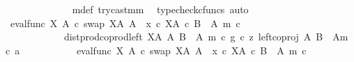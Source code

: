 \begin{isabellebody}
\ \ \ \ \ \ \ \ \ \ \ \ \isamarkupfalse%
\ m{\isacharunderscore}{\kern0pt}def{\isacharparenleft}{\kern0pt}{}{\isacharparenright}{\kern0pt}\ try{\isacharunderscore}{\kern0pt}cast{\isacharunderscore}{\kern0pt}m{\isacharunderscore}{\kern0pt}m\ \isamarkupfalse%
\ {\isacharparenleft}{\kern0pt}typecheck{\isacharunderscore}{\kern0pt}cfuncs{\isacharcomma}{\kern0pt}\ auto{\isacharparenright}{\kern0pt}\isanewline
\ \ \ \ \ \ \ \ \ \ \isamarkupfalse%
\ \isamarkupfalse%
\ {\isachardoublequoteopen}{\isacharparenleft}{\kern0pt}eval{\isacharunderscore}{\kern0pt}func\ X\ A\ {\isasymcirc}\isactrlsub c\ swap\ {\isacharparenleft}{\kern0pt}X\isactrlbsup A\isactrlesup {\isacharparenright}{\kern0pt}\ A{\isacharparenright}{\kern0pt}\ {\isasymamalg}\ {\isacharparenleft}{\kern0pt}x\ {\isasymcirc}\isactrlsub c\ {\isasymbeta}\isactrlbsub X\isactrlbsup A\isactrlesup \ {\isasymtimes}\isactrlsub c\ {\isacharparenleft}{\kern0pt}B\ {\isasymsetminus}\ {\isacharparenleft}{\kern0pt}A{\isacharcomma}{\kern0pt}\ m{\isacharparenright}{\kern0pt}{\isacharparenright}{\kern0pt}\isactrlesub {\isacharparenright}{\kern0pt}\ {\isasymcirc}\isactrlsub c\isanewline
\ \ \ \ \ \ \ \ \ \ \ \ dist{\isacharunderscore}{\kern0pt}prod{\isacharunderscore}{\kern0pt}coprod{\isacharunderscore}{\kern0pt}left\ {\isacharparenleft}{\kern0pt}X\isactrlbsup A\isactrlesup {\isacharparenright}{\kern0pt}\ A\ {\isacharparenleft}{\kern0pt}B\ {\isasymsetminus}\ {\isacharparenleft}{\kern0pt}A{\isacharcomma}{\kern0pt}\ m{\isacharparenright}{\kern0pt}{\isacharparenright}{\kern0pt}\ {\isasymcirc}\isactrlsub c\ {\isasymlangle}g\ {\isasymcirc}\isactrlsub c\ z{\isacharcomma}{\kern0pt}\ left{\isacharunderscore}{\kern0pt}coproj\ A\ {\isacharparenleft}{\kern0pt}B\ {\isasymsetminus}\ {\isacharparenleft}{\kern0pt}A{\isacharcomma}{\kern0pt}m{\isacharparenright}{\kern0pt}{\isacharparenright}{\kern0pt}\ {\isasymcirc}\isactrlsub c\ a{\isasymrangle}\isanewline
\ \ \ \ \ \ \ \ \ \ {\isacharequal}{\kern0pt}\ {\isacharparenleft}{\kern0pt}eval{\isacharunderscore}{\kern0pt}func\ X\ A\ {\isasymcirc}\isactrlsub c\ swap\ {\isacharparenleft}{\kern0pt}X\isactrlbsup A\isactrlesup {\isacharparenright}{\kern0pt}\ A{\isacharparenright}{\kern0pt}\ {\isasymamalg}\ {\isacharparenleft}{\kern0pt}x\ {\isasymcirc}\isactrlsub c\ {\isasymbeta}\isactrlbsub X\isactrlbsup A\isactrlesup \ {\isasymtimes}\isactrlsub c\ {\isacharparenleft}{\kern0pt}B\ {\isasymsetminus}\ {\isacharparenleft}{\kern0pt}A{\isacharcomma}{\kern0pt}\ m{\isacharparenright}{\kern0pt}{\isacharparenright}{\kern0pt}\isactrlesub {\isacharparenright}{\kern0pt}\ {\isasymcirc}\isactrlsub c\isanewline

\end{isabellebody}
